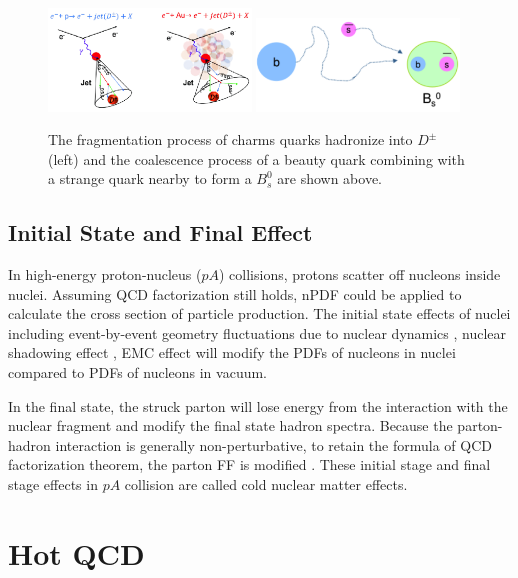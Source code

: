 \begin{figure}[hbtp]
\begin{center}
\includegraphics[width=0.48\textwidth]{Figures/Chapter1/FragCartoon.png}
\includegraphics[width=0.48\textwidth]{Figures/Chapter1/CoalCartoon.png}
\caption{The fragmentation process of charms quarks hadronize into $D^\pm$ (left) and the coalescence process of a beauty quark combining with a strange quark nearby to form a $B^0_s$ are shown above.}
\label{HadMech}
\end{center}
\end{figure} 


\subsection{Initial State and Final Effect}

In high-energy proton-nucleus ($pA$) collisions, protons scatter off nucleons inside nuclei. Assuming QCD factorization still holds, nPDF could be applied to calculate the cross section of particle production. The initial state effects of nuclei including event-by-event geometry fluctuations due to nuclear dynamics \cite{GuntherV3}, nuclear shadowing effect \cite{NuclearShadowing}, EMC effect \cite{EMC} will modify the PDFs of nucleons in nuclei compared to PDFs of nucleons in vacuum. 

In the final state, the struck parton will lose energy from the interaction with the nuclear fragment and modify the final state hadron spectra. Because the parton-hadron interaction is generally non-perturbative, to retain the formula of QCD factorization theorem, the parton FF is modified \cite{CNEEFF}. These initial stage and final stage effects in $pA$ collision are called cold nuclear matter effects. 

\section{Hot QCD}

